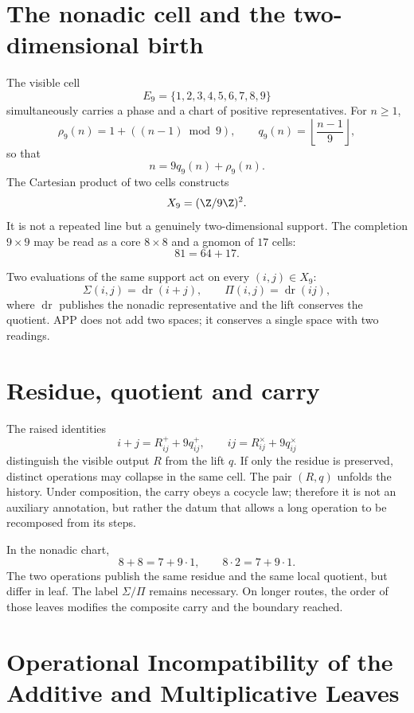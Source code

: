 \section{The nonadic cell and the two-dimensional birth}

The visible cell
\[
 E_9=\{1,2,3,4,5,6,7,8,9\}
\]
simultaneously carries a phase and a chart of positive representatives. For
\(n\ge1\),
\[
 \rho_9(n)=1+((n-1)\bmod9),\qquad
 q_9(n)=\left\lfloor\frac{n-1}{9}\right\rfloor,
\]
so that
\[
 n=9q_9(n)+\rho_9(n).
\]
The Cartesian product of two cells constructs
\[
 X_9=(\Z/9\Z)^2.
\]
It is not a repeated line but a genuinely two-dimensional support. The
completion \(9\times9\) may be read as a core \(8\times8\) and a
gnomon of \(17\) cells:
\[
81=64+17.
\]

Two evaluations of the same support act on every \((i,j)\in X_9\):
\[
 \Sigma(i,j)=\operatorname{dr}(i+j),\qquad
 \Pi(i,j)=\operatorname{dr}(ij),
\]
where \(\operatorname{dr}\) publishes the nonadic representative and the
lift conserves the quotient. APP does not add two spaces; it conserves a
single space with two readings.

\section{Residue, quotient and carry}

The raised identities
\[
 i+j=R^+_{ij}+9q^+_{ij},\qquad
 ij=R^\times_{ij}+9q^\times_{ij}
\]
distinguish the visible output \(R\) from the lift \(q\). If only
the residue is preserved, distinct operations may collapse in the same
cell. The pair \((R,q)\) unfolds the history. Under composition, the
carry obeys a cocycle law; therefore it is not an auxiliary annotation,
but rather the datum that allows a long operation to be recomposed from its steps.

\begin{example}
In the nonadic chart,
\[
 8+8=7+9\cdot1,\qquad 8\cdot2=7+9\cdot1.
\]
The two operations publish the same residue and the same local quotient,
but differ in leaf. The label \(\Sigma/\Pi\) remains necessary.
On longer routes, the order of those leaves modifies the composite carry and
the boundary reached.
\end{example}

\section{Operational Incompatibility of the Additive and Multiplicative Leaves}

